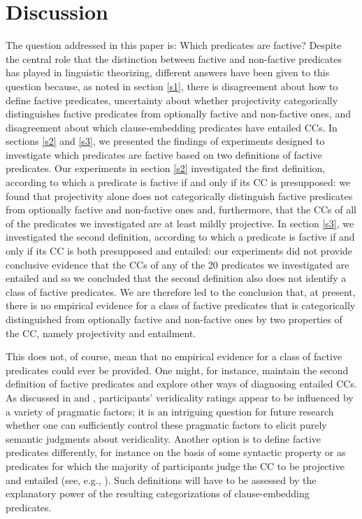 \documentclass[11pt,fleqn]{article}
\newcommand{\6}{\mbox{$[\hspace*{-.6mm}[$}}
\newcommand{\9}{\mbox{$]\hspace*{-.6mm}]$}}
\begin{document}
{\section{Discussion}\label{s4}

The question addressed in this paper is: Which predicates are factive? Despite the central role that the distinction between factive and non-factive predicates has played in linguistic theorizing, different answers have been given to this question because, as noted in section \ref{s1}, there is disagreement about how to define factive predicates, uncertainty about whether projectivity categorically distinguishes factive predicates from optionally factive and non-factive ones, and disagreement about which clause-embedding predicates have entailed CCs. In sections \ref{s2} and \ref{s3}, we presented the findings of experiments designed to investigate which predicates are factive based on  two definitions of factive predicates. Our experiments in section \ref{s2} investigated the first definition, according to which a predicate is factive if and only if its CC is presupposed: we found that projectivity alone does not categorically distinguish factive predicates from optionally factive and non-factive ones and, furthermore, that the CCs of all of the predicates we investigated are at least mildly projective. In section \ref{s3}, we investigated the second definition, according to which a predicate is factive if and only if its CC is both presupposed and entailed: our experiments did not provide conclusive evidence that the CCs of any of the 20 predicates we investigated are entailed and so we concluded that the second definition also does not identify a class of factive predicates. We are therefore led to the conclusion that, at present, there is no empirical evidence for a class of factive predicates that is categorically distinguished from optionally factive and non-factive ones by two properties of the CC, namely projectivity and entailment. 

This does not, of course, mean that no empirical evidence for a class of factive predicates could ever be provided. One might, for instance, maintain the second definition of factive predicates and explore other ways of diagnosing entailed CCs. As discussed in \citealt{demarneffe-etal2012} and \citealt{pavlick-kwiatkowski2019}, participants' veridicality ratings appear to be influenced by a variety of pragmatic factors; it is an intriguing question for future research whether one can sufficiently control these pragmatic factors to elicit purely semantic judgments about veridicality. Another option is to define factive predicates differently, for instance on the basis of some syntactic property or as predicates for which the majority of participants judge the CC to be projective and entailed (see, e.g., \citealt{white-rawlins-nels2018}). Such definitions will have to be assessed by the explanatory power of the resulting categorizations of clause-embedding predicates. 

}
\end{document}
